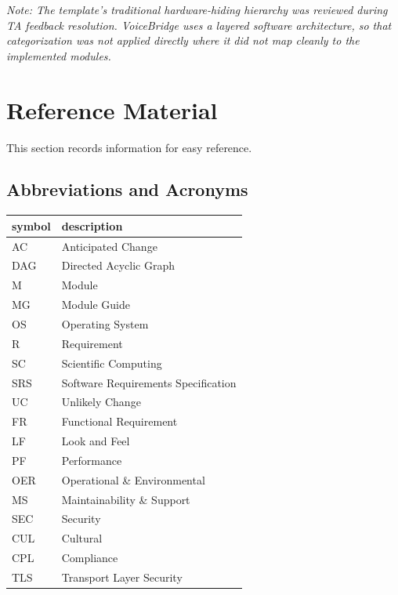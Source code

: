 \documentclass[12pt, titlepage]{article}
\begin{document}
\noindent\textit{Note: The template's traditional hardware-hiding hierarchy was reviewed during TA feedback resolution. VoiceBridge uses a layered software architecture, so that categorization was not applied directly where it did not map cleanly to the implemented modules.}

\newpage

\section{Reference Material}

This section records information for easy reference.

\subsection{Abbreviations and Acronyms}

\renewcommand{\arraystretch}{1.2}
\begin{tabular}{l l} 
  \toprule		
  \textbf{symbol} & \textbf{description}\\
  \midrule 
  AC & Anticipated Change\\
  DAG & Directed Acyclic Graph \\
  M & Module \\
  MG & Module Guide \\
  OS & Operating System \\
  R & Requirement\\
  SC & Scientific Computing \\
  SRS & Software Requirements Specification\\
  UC & Unlikely Change \\
  FR & Functional Requirement\\
  LF & Look and Feel \\
  PF & Performance \\
  OER & Operational \& Environmental \\
  MS & Maintainability \& Support \\
  SEC & Security \\
  CUL & Cultural \\
  CPL & Compliance \\
  TLS & Transport Layer Security\\
  
  \bottomrule
\end{tabular}\\

\newpage
\end{document}

